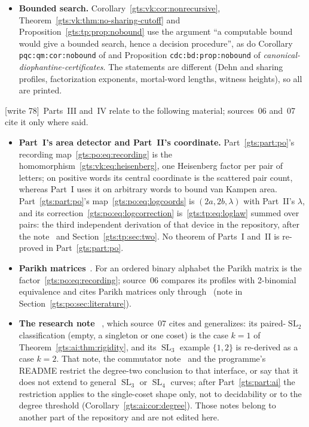\documentclass[11pt,letterpaper]{article}
\theoremstyle{definition}
\theoremstyle{remark}
\newcommand{\SL}{\operatorname{SL}}
\newcommand{\wtagb}{\textup{[write 78]}}
\begin{document}
\begin{itemize}
\item \textbf{Bounded search.} Corollary~\ref{gts:vk:cor:nonrecursive}, Theorem~\ref{gts:vk:thm:no-sharing-cutoff} and Proposition~\ref{gts:tp:prop:nobound} use the argument ``a computable bound would give a bounded search, hence a decision procedure'', as do Corollary \texttt{pqc:qm:cor:nobound} of \cite{pqc} and Proposition \texttt{cdc:bd:prop:nobound} of \emph{canonical-diophantine-certificates}. The statements are different (Dehn and sharing profiles, factorization exponents, mortal-word lengths, witness heights), so all are printed.
\end{itemize}

\wtagb\ Parts~III and~IV relate to the following material; sources~06 and~07 cite it only where said.
\begin{itemize}
\item \textbf{Part~I's area detector and Part~II's coordinate.} Part~\ref{gts:part:po}'s recording map~\eqref{gts:po:eq:recording} is the homomorphism~\eqref{gts:vk:eq:heisenberg}, one Heisenberg factor per pair of letters; on positive words its central coordinate is the scattered pair count, whereas Part~I uses it on arbitrary words to bound van Kampen area. Part~\ref{gts:part:po}'s map~\eqref{gts:po:eq:logcoords} is $(2a,2b,\lambda)$ with Part~II's $\lambda$, and its correction~\eqref{gts:po:eq:logcorrection} is~\eqref{gts:tp:eq:loglaw} summed over pairs: the third independent derivation of that device in the repository, after the note~\cite{repo-heis} and Section~\ref{gts:tp:sec:two}. No theorem of Parts~I and~II is re-proved in Part~\ref{gts:part:po}.
\item \textbf{Parikh matrices}~\cite{mssy}. For an ordered binary alphabet the Parikh matrix is the factor~\eqref{gts:po:eq:recording}; source~06 compares its profiles with 2-binomial equivalence and cites Parikh matrices only through~\cite{po-teh} (note in Section~\ref{gts:po:sec:literature}).
\item \textbf{The research note }~\cite{ai-repoaffine}, which source~07 cites and generalizes: its paired-$\SL_2$ classification (empty, a singleton or one coset) is the case $k=1$ of Theorem~\ref{gts:ai:thm:rigidity}, and its $\SL_3$ example $\{1,2\}$ is re-derived as a case $k=2$. That note, the commutator note~\cite{repo-comm} and the programme's README restrict the degree-two conclusion to that interface, or say that it does not extend to general $\SL_3$ or $\SL_4$ curves; after Part~\ref{gts:part:ai} the restriction applies to the single-coset shape only, not to decidability or to the degree threshold (Corollary~\ref{gts:ai:cor:degree}). Those notes belong to another part of the repository and are not edited here.

\end{itemize}
\end{document}
